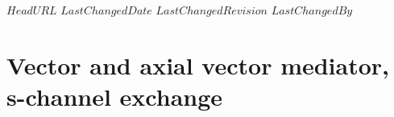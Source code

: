 \svnidlong
{$HeadURL$}
{$LastChangedDate$}
{$LastChangedRevision$}
{$LastChangedBy$}

\section{Vector and axial vector mediator, s-channel exchange}
\label{sec:monojet_V}


